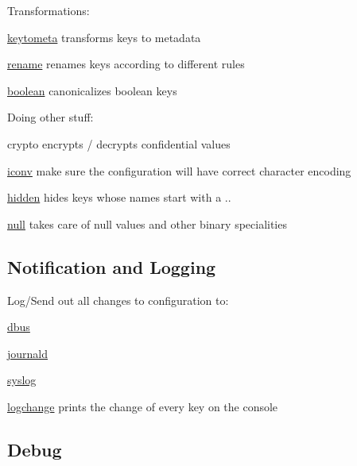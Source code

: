 Transformations\+:


\begin{DoxyItemize}
\item \hyperlink{md_src_plugins_keytometa_README_src_plugins_keytometa_README_md}{keytometa} transforms keys to metadata
\item \hyperlink{md_src_plugins_rename_README_src_plugins_rename_README_md}{rename} renames keys according to different rules
\item \hyperlink{md_src_plugins_boolean_README_src_plugins_boolean_README_md}{boolean} canonicalizes boolean keys
\end{DoxyItemize}

Doing other stuff\+:


\begin{DoxyItemize}
\item crypto encrypts / decrypts confidential values
\item \hyperlink{md_src_plugins_iconv_README_src_plugins_iconv_README_md}{iconv} make sure the configuration will have correct character encoding
\item \hyperlink{md_src_plugins_hidden_README_src_plugins_hidden_README_md}{hidden} hides keys whose names start with a {\ttfamily .}.
\item \hyperlink{md_src_plugins_null_README_src_plugins_null_README_md}{null} takes care of null values and other binary specialities
\end{DoxyItemize}

\subsection*{Notification and Logging}

Log/\+Send out all changes to configuration to\+:


\begin{DoxyItemize}
\item \hyperlink{md_src_plugins_dbus_README_src_plugins_dbus_README_md}{dbus}
\item \hyperlink{md_src_plugins_journald_README_src_plugins_journald_README_md}{journald}
\item \hyperlink{md_src_plugins_syslog_README_src_plugins_syslog_README_md}{syslog}
\item \hyperlink{md_src_plugins_logchange_README_src_plugins_logchange_README_md}{logchange} prints the change of every key on the console
\end{DoxyItemize}

\subsection*{Debug}


